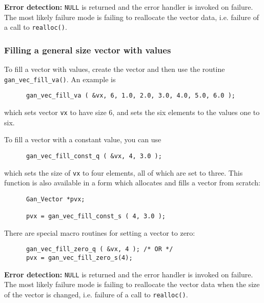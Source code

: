 {\bf Error detection:} {\tt NULL} is returned and the error handler is
invoked on failure. The most likely failure mode is failing to reallocate
the vector data, i.e. failure of a call to {\tt realloc()}.

\subsubsection{Filling a general size vector with values}
   \label{fill-vec-gen-sec}
To fill a vector with values, create the vector and then use the routine
{\tt gan\_vec\_fill\_va()}. An example is
\begin{verbatim}
      gan_vec_fill_va ( &vx, 6, 1.0, 2.0, 3.0, 4.0, 5.0, 6.0 );
\end{verbatim}
which sets vector {\tt vx} to have size 6, and sets the six elements to
the values one to six.

To fill a vector with a constant value, you can use
\begin{verbatim}
      gan_vec_fill_const_q ( &vx, 4, 3.0 );
\end{verbatim}
which sets the size of {\tt vx} to four elements, all of which are set to
three. This function is also available in a form which allocates and fills a
vector from scratch:
\begin{verbatim}
      Gan_Vector *pvx;

      pvx = gan_vec_fill_const_s ( 4, 3.0 );
\end{verbatim}
There are special macro routines for setting a vector to zero:
\begin{verbatim}
      gan_vec_fill_zero_q ( &vx, 4 ); /* OR */
      pvx = gan_vec_fill_zero_s(4);
\end{verbatim}

{\bf Error detection:} {\tt NULL} is returned and the error handler is
invoked on failure. The most likely failure mode is failing to reallocate
the vector data when the size of the vector is changed,
i.e. failure of a call to {\tt realloc()}.


